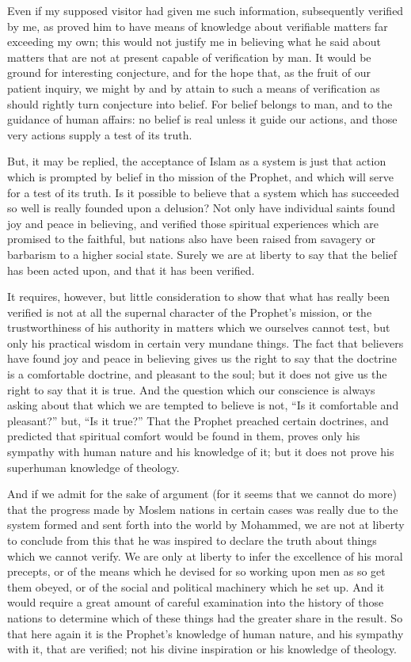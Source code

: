 \documentclass[12pt]{article}
\begin{document}
Even if my supposed visitor had given me such information, subsequently verified by me, as proved him to have means of knowledge about verifiable matters far exceeding my own; this would not justify me in believing what he said about matters that are not at present capable of verification by man. It would be ground for interesting conjecture, and for the hope that, as the fruit of our patient inquiry, we might by and by attain to such a means of verification as should rightly turn conjecture into belief. For belief belongs to man, and to the guidance of human affairs: no belief is real unless it guide our actions, and those very actions supply a test of its truth.

But, it may be replied, the acceptance of Islam as a system is just that action which is prompted by belief in tho mission of the Prophet, and which will serve for a test of its truth. Is it possible to believe that a system which has succeeded so well is really founded upon a delusion? Not only have individual saints found joy and peace in believing, and verified those spiritual experiences which are promised to the faithful, but nations also have been raised from savagery or barbarism to a higher social state. Surely we are at liberty to say that the belief has been acted upon, and that it has been verified.

It requires, however, but little consideration to show that what has really been verified is not at all the supernal character of the Prophet's mission, or the trustworthiness of his authority in matters which we ourselves cannot test, but only his practical wisdom in certain very mundane things. The fact that believers have found joy and peace in believing gives us the right to say that the doctrine is a comfortable doctrine, and pleasant to the soul; but it does not give us the right to say that it is true. And the question which our conscience is always asking about that which we are tempted to believe is not, ``Is it comfortable and pleasant?'' but, ``Is it true?'' That the Prophet preached certain doctrines, and predicted that spiritual comfort would be found in them, proves only his sympathy with human nature and his knowledge of it; but it does not prove his superhuman knowledge of theology.

And if we admit for the sake of argument (for it seems that we cannot do more) that the progress made by Moslem nations in certain cases was really due to the system formed and sent forth into the world by Mohammed, we are not at liberty to conclude from this that he was inspired to declare the truth about things which we cannot verify. We are only at liberty to infer the excellence of his moral precepts, or of the means which he devised for so working upon men as so get them obeyed, or of the social and political machinery which he set up. And it would require a great amount of careful examination into the history of those nations to determine which of these things had the greater share in the result. So that here again it is the Prophet's knowledge of human nature, and his sympathy with it, that are verified; not his divine inspiration or his knowledge of theology.
\end{document}

